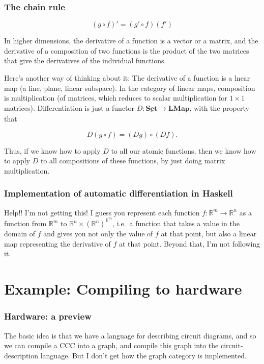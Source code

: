 \documentclass[10pt]{beamer}
\newcommand{\Cat}[1]{\ensuremath{\underline{\mathbf{#1}}}}
\theoremstyle{definition}
\theoremstyle{remark}
\numberwithin{equation}{section}
\begin{document}
\begin{frame}[fragile]
  \frametitle{The chain rule}

  \[(g \circ f)' = (g' \circ f) (f')\]

  In higher dimensions, the derivative of a function is a vector or a matrix,
  and the derivative of a composition of two functions is the product of the two
  matrices that give the derivatives of the individual functions.

  Here's another way of thinking about it: The derivative of a function is a
  lnear map (a line, plane, linear subspace). In the category of linear maps,
  composition is multiplication (of matrices, which reduces to scalar
  multiplication for $1 \times 1$ matrices). Differentiation is just a functor
  $D\colon \Cat{Set} \rightarrow \Cat{LMap}$, with the property that

  \[
    D(g \circ f) = (D g) \circ (D f).
  \]

  Thus, if we know how to apply $D$ to all our atomic functions, then we know
  how to apply $D$ to all compositions of these functions, by just doing matrix multiplication.
  
\end{frame}

\begin{frame}[fragile]
  \frametitle{Implementation of automatic differentiation in Haskell}

  Help!! I'm not getting this! I guess you represent each function $f\colon
  \mathbb{R}^m \rightarrow \mathbb{R}^n$ as a function from $\mathbb{R}^m$ to
  $\mathbb{R}^n \times {\left(\mathbb{R}^n\right)}^{\mathbb{R}^m}$, i.e.\ a function
  that takes a value in the domain of $f$ and gives you not only the value of
  $f$ at that point, but also a linear map representing the derivative of $f$ at
  that point. Beyond that, I'm not following it.
\end{frame}

\section{Example: Compiling to hardware}

\begin{frame}[fragile]
  \frametitle{Hardware: a preview}

  The basic idea is that we have a language for describing circuit diagrams, and
  so we can compile a CCC into a graph, and compile this graph into the
  circuit-description language. But I don't get how the graph category is
  implemented.
  
\end{frame}
\end{document}
